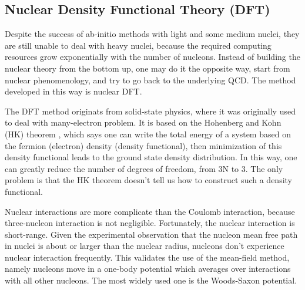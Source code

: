 \begin{comment}
Deviation of ab-initio result and observation for heavy nuclei indicates the 
importance of higher-order interactions.

\begin{equation}
    \CL_{eff} = \CL_{\pi\pi} + \CL_{\pi N} + \CL_{NN} + \cdots
\end{equation}

three-nucleon forces are hard to observe directly, they increase the pressure of
neutron matter and therefore the neutron skin thickness of both \Pb and \Ca.

three-nucleon force term
\begin{itemize}
    \item Long-range two-pion exchange
    \item Medium-range one-pion exchange
    \item Short range three-nucleon contact
\end{itemize}
\end{comment}
\subsection{Nuclear Density Functional Theory (DFT)}
Despite the success of ab-initio methods with light and some medium nuclei, 
they are still unable to deal with heavy nuclei, because the required computing resources 
grow exponentially with the number of nucleons.
Instead of building the nuclear theory from the bottom up, one may do it the opposite
way, start from nuclear phenomenology, and try to go back to the underlying
QCD. The method developed in this way is nuclear DFT.

The DFT method originats from solid-state physics, where it was originally used to deal with
many-electron problem. It is based on the Hohenberg and Kohn (HK) theorem \cite{PhysRevC.57.3430}, 
which says one can write the total energy of a system
based on the fermion (electron) density (density functional), 
then minimization of this density functional leads to the ground state 
density distribution. In this way, one can greatly reduce the number of degrees of freedom, 
from 3N to 3. The only problem is that the HK theorem 
doesn't tell us how to construct such a density functional.

Nuclear interactions are more complicate than the Coulomb interaction, 
because three-nucleon interaction is not negligible. Fortunately, the nuclear interaction
is short-range. Given the experimental observation that the nucleon mean
free path in nuclei is about or larger than the nuclear radius, 
nucleons don't experience nuclear interaction frequently. This validates the use
of the mean-field method, namely nucleons move in a one-body potential which averages 
over interactions with all other nucleons. The most widely used one is the Woods-Saxon
potential.

